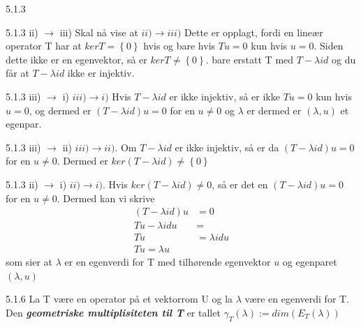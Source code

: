 \documentclass[a4paper,norsk]{article}
\begin{document}
\begin{oppgavebox}{5.1.3}{}
\begin{proofbox}{5.1.3 ii) $ \rightarrow $ iii) }{}
Skal nå vise at $ ii) \rightarrow iii) $ Dette er opplagt, fordi en lineær operator T har at $ ker T = \left\{ 0 \right\}  $ hvis og bare hvis $ Tu = 0 $ kun hvis $ u=0 $. Siden dette ikke er en egenvektor, så er   $ ker T \neq \left\{ 0 \right\}  $. bare erstatt T med $ T - \lambda  id $ og du får at $ T - \lambda id $ ikke er injektiv.  
\end{proofbox}

\begin{proofbox}{5.1.3 iii) $ \rightarrow $ i)}{}
$ iii) \rightarrow i) $ Hvis $ T - \lambda id $ er ikke injektiv, så er ikke $ Tu = 0 $ kun hvis $ u=0 $, og dermed er $ \left( T - \lambda id \right)u = 0  $ for en $ u\neq 0 $ og $ \lambda  $ er dermed er $ \left( \lambda , u \right)  $ et egenpar.
\end{proofbox}

\begin{proofbox}{5.1.3 iii) $ \rightarrow $ ii)}{}
$ iii) \rightarrow ii) $. Om $ T - \lambda id $ er ikke injektiv, så er da $ \left( T - \lambda id \right)u= 0 $ for en $ u\neq 0 $. Dermed er $ ker \left( T - \lambda id \right) \neq \left\{ 0 \right\}   $ 
\end{proofbox}

\begin{proofbox}{5.1.3 ii) $ \rightarrow $ i)}{}
$ ii) \rightarrow i) $. Hvis $ ker \left( T - \lambda id \right) \neq 0 $, så er det en $ \left( T - \lambda id \right)u = 0  $ for en $ u\neq 0 $. Dermed kan vi skrive 
\begin{align*}
    \left( T - \lambda id \right)u &= 0 \\
    Tu - \lambda id u &= \\
    Tu &= \lambda id u \\
    Tu = \lambda u
\end{align*}
som sier at $ \lambda  $ er en egenverdi for T med tilhørende egenvektor $ u $ og egenparet $ \left( \lambda , u \right)  $   
\end{proofbox}
\end{oppgavebox}



\begin{definitionbox}{5.1.6}{}
La T være en operator på et vektorrom U og la $ \lambda  $ være en egenverdi for T. Den \textbf{\textit{geometriske multiplisiteten til T }} er tallet $ \gamma_T ( \lambda ) := dim \left( E_T ( \lambda ) \right)  $  
\end{definitionbox}
\end{document}
